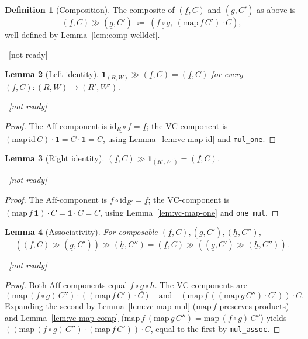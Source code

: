 \documentclass[11pt]{article}
\newcommand{\lean}[1]{\par\smallskip\noindent{\footnotesize\texttt{Lean:\ #1}}\par}
\newcommand{\uses}[1]{}
\newcommand{\notready}{{\footnotesize\textcolor{red!60!black}{\ [not ready]}}}
\theoremstyle{definition}
\newtheorem{definition}{Definition}[section]
\theoremstyle{plain}
\newtheorem{lemma}[definition]{Lemma}
\theoremstyle{remark}
\newcommand{\Aff}{\mathrm{Aff}}
\newcommand{\VC}{\mathrm{VC}}
\newcommand{\id}{\mathrm{id}}
\newcommand{\map}{\mathrm{map}}
\newcommand{\onel}{\mathbf 1}
\begin{document}
\begin{definition}[Composition]\label{def:total-comp}
The composite of $(\underline f,C)$ and $(\underline g,C')$ as above is
\begin{equation}\label{eq:comp}
   (\underline f,C)\gg(\underline g,C')\;\coloneqq\;
   (\underline{f\circ g},\ (\map\,f\,C')\cdot C ),
\end{equation}
well-defined by Lemma~\ref{lem:comp-welldef}.
\lean{}\notready
\uses{lem:comp-welldef,def:vc-map}
\end{definition}

\begin{lemma}[Left identity]\label{lem:total-id-comp}
$\onel_{(R,W)}\gg(\underline f,C)=(\underline f,C)$ for every
$(\underline f,C):(R,W)\to(R',W')$.
\lean{}\notready
\uses{def:total-comp,def:total-id,lem:vc-map-id}
\end{lemma}
\begin{proof}
The $\Aff$-component is $\underline{\id_R\circ f}=\underline f$; the
$\VC$-component is $(\map\,\id\,C)\cdot\onel=C\cdot\onel=C$, using
Lemma~\ref{lem:vc-map-id} and \texttt{mul\_one}.
\end{proof}

\begin{lemma}[Right identity]\label{lem:total-comp-id}
$(\underline f,C)\gg\onel_{(R',W')}=(\underline f,C)$.
\lean{}\notready
\uses{def:total-comp,def:total-id,lem:vc-map-one}
\end{lemma}
\begin{proof}
The $\Aff$-component is $\underline{f\circ\id_{R'}}=\underline f$; the
$\VC$-component is $(\map\,f\,\onel)\cdot C=\onel\cdot C=C$, using
Lemma~\ref{lem:vc-map-one} and \texttt{one\_mul}.
\end{proof}

\begin{lemma}[Associativity]\label{lem:total-assoc}
For composable $(\underline f,C),(\underline g,C'),(\underline h,C'')$,
\[
 ((\underline f,C)\gg(\underline g,C'))\gg(\underline h,C'')
 =(\underline f,C)\gg((\underline g,C')\gg(\underline h,C'')).
\]
\lean{}\notready
\uses{def:total-comp,lem:vc-map-mul,lem:vc-map-comp}
\end{lemma}
\begin{proof}
Both $\Aff$-components equal $\underline{f\circ g\circ h}$.  The $\VC$-components
are
\[
 (\map\,(f\circ g)\,C'')\cdot((\map\,f\,C')\cdot C)
 \quad\text{and}\quad
 (\map\,f\,((\map\,g\,C'')\cdot C'))\cdot C .
\]
Expanding the second by Lemma~\ref{lem:vc-map-mul} ($\map\,f$ preserves products)
and Lemma~\ref{lem:vc-map-comp}
($\map\,f\,(\map\,g\,C'')=\map\,(f\circ g)\,C''$) yields
$((\map\,(f\circ g)\,C'')\cdot(\map\,f\,C'))\cdot C$, equal to the first by
\texttt{mul\_assoc}.
\end{proof}
\end{document}
